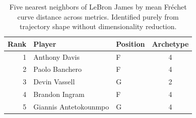 \begin{table}[htbp]
  \centering\small
  \begin{tabular}{rllc}
    \toprule
    Rank & Player & Position & Archetype \\
    \midrule
    1 & Anthony Davis & F & 4 \\
    2 & Paolo Banchero & F & 4 \\
    3 & Devin Vassell & G & 2 \\
    4 & Brandon Ingram & F & 4 \\
    5 & Giannis Antetokounmpo & G & 4 \\
    \bottomrule
  \end{tabular}
  \caption{Five nearest neighbors of LeBron James by mean Fr\'{e}chet curve distance across metrics. Identified purely from trajectory shape without dimensionality reduction.}
  \label{tab:LeBron_James_frechet_curve_neighbors}
\end{table}

